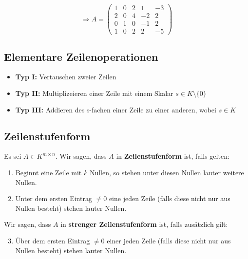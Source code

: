 \documentclass{scrartcl}
\begin{document}
\[
\Rightarrow A = 
\left(\begin{array}{cccc|c}
1 & 0 & 2 & 1 & -3 \\
2 & 0 & 4 & -2 & 2\\
0 & 1 & 0 & -1 & 2\\
1 & 0 & 2 & 2 & -5
\end{array}\right)
\]

\subsection{Elementare Zeilenoperationen}
\label{elementare Zeilenoperationen}

\begin{itemize}
\item \textbf{Typ I:} Vertauschen zweier Zeilen
\item \textbf{Typ II:} Multiplizeieren einer Zeile mit einem Skalar $s \in K \setminus \{0\}$
\item \textbf{Typ III:} Addieren des s-fachen einer Zeile zu einer anderen, wobei $s \in K$
\end{itemize}

\subsection{Zeilenstufenform}
\label{Zeilenstufenform}

\begin{Def}
Es sei $A \in K^{m \times n}$. Wir sagen, dass $A$ in \textbf{Zeilenstufenform} ist, falls gelten:
\begin{enumerate}[label={(\alph*)}]
\item Beginnt eine Zeile mit $k$ Nullen, so stehen unter diesen Nullen lauter weitere Nullen.
\item Unter dem ersten Eintrag $\neq 0$ eine jeden Zeile (falls diese nicht nur aus Nullen besteht) stehen lauter Nullen.
\end{enumerate}
Wir sagen, dass $A$  in \textbf{strenger Zeilenstufenform} ist, falls zusätzlich gilt:
\begin{enumerate}[label={(\alph*)}]
\setcounter{enumi}{2}
\item Über dem ersten Eintrag $\neq 0$ einer jeden Zeile (falls diese nicht nur aus Nullen besteht) stehen lauter Nullen.
\end{enumerate}
\end{Def}
\end{document}
